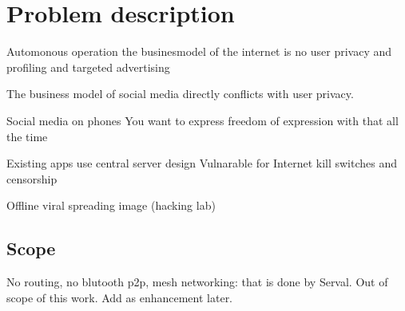 \chapter{Problem description}



Automonous operation
the businesmodel of the internet is no user privacy and profiling and targeted advertising



The business model of social media directly conflicts with user privacy. %

Social media on phones
You want to express freedom of expression with that all the time

Existing apps use central server design
Vulnarable for Internet kill switches and censorship

Offline viral spreading image (hacking lab)





\section{Scope}
No routing, no blutooth p2p, mesh networking: that is done by Serval. Out of scope of this work. Add as enhancement later.








